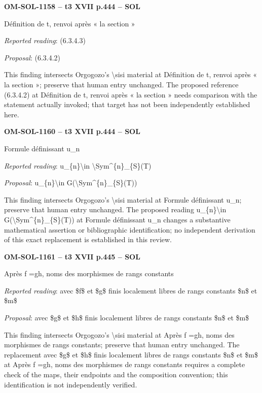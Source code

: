 \par\noindent\textbf{OM-SOL-1158 -- t3 XVII p.444 -- SOL}\par
Définition de t, renvoi après « la section »\par
\emph{Reported reading}: (6.3.4.3)\par
\emph{Proposal}: (6.3.4.2)\par
This finding intersects Orgogozo's \textbackslash{}sisi material at Définition de t, renvoi après « la section »; preserve that human entry unchanged. The proposed reference (6.3.4.2) at Définition de t, renvoi après « la section » needs comparison with the statement actually invoked; that target has not been independently established here.\par
\par\noindent\textbf{OM-SOL-1160 -- t3 XVII p.444 -- SOL}\par
Formule définissant u\_n\par
\emph{Reported reading}: u\_\{n\}\textbackslash{}in \textbackslash{}Sym\textasciicircum{}\{n\}\_\{S\}(T)\par
\emph{Proposal}: u\_\{n\}\textbackslash{}in G(\textbackslash{}Sym\textasciicircum{}\{n\}\_\{S\}(T))\par
This finding intersects Orgogozo's \textbackslash{}sisi material at Formule définissant u\_n; preserve that human entry unchanged. The proposed reading u\_\{n\}\textbackslash{}in G(\textbackslash{}Sym\textasciicircum{}\{n\}\_\{S\}(T)) at Formule définissant u\_n changes a substantive mathematical assertion or bibliographic identification; no independent derivation of this exact replacement is established in this review.\par
\par\noindent\textbf{OM-SOL-1161 -- t3 XVII p.445 -- SOL}\par
Après f =\allowbreak  gh, noms des morphismes de rangs constants\par
\emph{Reported reading}: avec \$f\$ et \$g\$ finis localement libres de rangs constants \$n\$ et \$m\$\par
\emph{Proposal}: avec \$g\$ et \$h\$ finis localement libres de rangs constants \$n\$ et \$m\$\par
This finding intersects Orgogozo's \textbackslash{}sisi material at Après f =\allowbreak  gh, noms des morphismes de rangs constants; preserve that human entry unchanged. The replacement avec \$g\$ et \$h\$ finis localement libres de rangs constants \$n\$ et \$m\$ at Après f =\allowbreak  gh, noms des morphismes de rangs constants requires a complete check of the maps, their endpoints and the composition convention; this identification is not independently verified.\par
